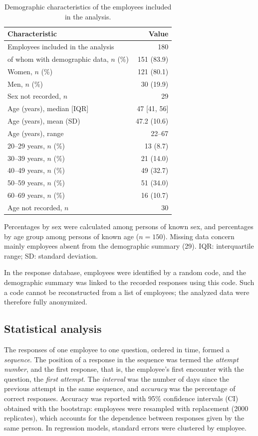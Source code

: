 \documentclass[11pt]{article}
\providecommand{\uwagatabeli}[1]{\par\vspace{2pt}\parbox{\linewidth}{\footnotesize #1}}
\newcommand{\DemoUnmatched}{29}
\newcommand{\DemoAgeN}{150}
\newcommand{\BootReps}{2000}
\begin{document}
\begin{table}[H]
\centering
\caption{Demographic characteristics of the employees included in the analysis.}
\label{tab:demografia}
\small
\begin{tabular}{lr}
\toprule
Characteristic & Value \\
\midrule
Employees included in the analysis & 180 \\
of whom with demographic data, $n$ (\%) & 151 (83.9) \\
\midrule
Women, $n$ (\%) & 121 (80.1) \\
Men, $n$ (\%) & 30 (19.9) \\
Sex not recorded, $n$ & 29 \\
\midrule
Age (years), median [IQR] & 47 [41, 56] \\
Age (years), mean (SD) & 47.2 (10.6) \\
Age (years), range & 22--67 \\
\midrule
20--29 years, $n$ (\%) & 13 (8.7) \\
30--39 years, $n$ (\%) & 21 (14.0) \\
40--49 years, $n$ (\%) & 49 (32.7) \\
50--59 years, $n$ (\%) & 51 (34.0) \\
60--69 years, $n$ (\%) & 16 (10.7) \\
Age not recorded, $n$ & 30 \\
\bottomrule
\end{tabular}
\uwagatabeli{Percentages by sex were calculated among persons of known sex, and percentages by age
group among persons of known age ($n = \DemoAgeN$). Missing data concern mainly employees absent from
the demographic summary (\DemoUnmatched). IQR: interquartile range; SD: standard deviation.}
\end{table}

In the response database, employees were identified by a random code, and the demographic summary was
linked to the recorded responses using this code. Such a code cannot be reconstructed from a list of
employees; the analyzed data were therefore fully anonymized.

\subsection{Statistical analysis}
\label{sec:analiza}
The responses of one employee to one question, ordered in time, formed a \emph{sequence}. The position
of a response in the sequence was termed the \emph{attempt number}, and the first response, that is,
the employee's first encounter with the question, the \emph{first attempt}. The \emph{interval} was the
number of days since the previous attempt in the same sequence, and \emph{accuracy} was the percentage
of correct responses. Accuracy was reported with 95\% confidence intervals (CI) obtained with the
bootstrap: employees were resampled with replacement (\BootReps{} replicates), which accounts for the
dependence between responses given by the same person. In regression models, standard errors were
clustered by employee.
\end{document}
